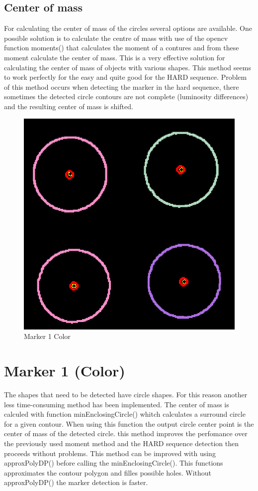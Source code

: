 \subsection{Center of mass}
For calculating the center of mass of the circles several options are available.
One possible solution is to calculate the centre of mass with use of the opencv function
moments() that calculates the moment of a contures and from these moment calculate the
center of mass. This is a very effective solution for calculating the center of mass of
objects with various shapes. This method seems to work perfectly for the easy and quite good
for the HARD sequence. Problem of this method occurs when detecting the marker in the hard sequence,
there sometimes the detected circle contours are not complete (luminosity differences) and the resulting
center of mass is shifted. 

\begin{figure}[ht!]
	\centering
	\includegraphics[width=\textwidth]{figures/Marker1centers}
	\caption{Marker 1 Color}
	\label{fig:markerColorcenter1}
\end{figure}
\section{Marker 1 (Color)} 

The shapes that need to be detected have circle shapes. For this reason another less time-consuming 
method has been implemented. The center of mass is calculed with function minEnclosingCircle() whitch calculates
a surround circle for a given contour. When using this function the output circle center point is the
center of mass of the detected circle. this method improves the perfomance over the previously used 
moment method and the HARD sequence detection then proceeds without problems. This method can be improved 
with using approxPolyDP() before calling the minEnclosingCircle(). This functions approximates the contour
polygon and filles possible holes. Without approxPolyDP() the marker detection is faster.
\newpage
